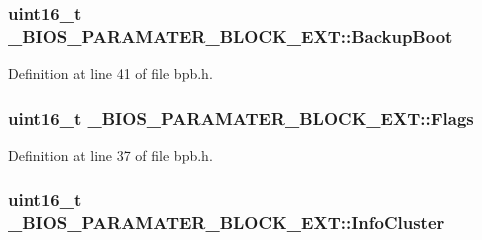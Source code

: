\subsubsection[{\texorpdfstring{Backup\+Boot}{BackupBoot}}]{\setlength{\rightskip}{0pt plus 5cm}uint16\+\_\+t \+\_\+\+B\+I\+O\+S\+\_\+\+P\+A\+R\+A\+M\+A\+T\+E\+R\+\_\+\+B\+L\+O\+C\+K\+\_\+\+E\+X\+T\+::\+Backup\+Boot}\hypertarget{struct__BIOS__PARAMATER__BLOCK__EXT_a6d35f095d874ab3b5f12ad6d79efc2a7}{}\label{struct__BIOS__PARAMATER__BLOCK__EXT_a6d35f095d874ab3b5f12ad6d79efc2a7}


Definition at line 41 of file bpb.\+h.

\subsubsection[{\texorpdfstring{Flags}{Flags}}]{\setlength{\rightskip}{0pt plus 5cm}uint16\+\_\+t \+\_\+\+B\+I\+O\+S\+\_\+\+P\+A\+R\+A\+M\+A\+T\+E\+R\+\_\+\+B\+L\+O\+C\+K\+\_\+\+E\+X\+T\+::\+Flags}\hypertarget{struct__BIOS__PARAMATER__BLOCK__EXT_a792e2adce56f9d75b1ae4b7a072da57f}{}\label{struct__BIOS__PARAMATER__BLOCK__EXT_a792e2adce56f9d75b1ae4b7a072da57f}


Definition at line 37 of file bpb.\+h.

\subsubsection[{\texorpdfstring{Info\+Cluster}{InfoCluster}}]{\setlength{\rightskip}{0pt plus 5cm}uint16\+\_\+t \+\_\+\+B\+I\+O\+S\+\_\+\+P\+A\+R\+A\+M\+A\+T\+E\+R\+\_\+\+B\+L\+O\+C\+K\+\_\+\+E\+X\+T\+::\+Info\+Cluster}\hypertarget{struct__BIOS__PARAMATER__BLOCK__EXT_a0ece333302e2be2993066c7b69b4a3c6}{}\label{struct__BIOS__PARAMATER__BLOCK__EXT_a0ece333302e2be2993066c7b69b4a3c6}


